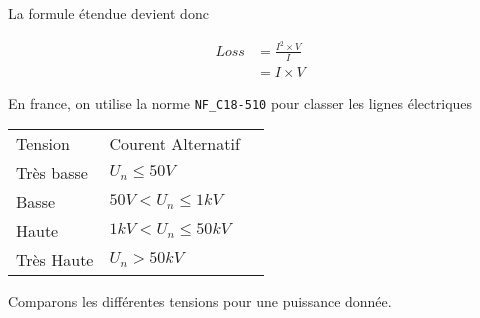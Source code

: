 La formule étendue devient donc

\begin{equation} \label{loss}
  \begin{aligned}
    Loss & = \frac{I^2\times V}{I} \\
         & = I \times V
  \end{aligned}
\end{equation}

En france, on utilise la norme \texttt{NF\_C18-510} pour classer les lignes électriques

\begin{table}[]
  \begin{tabular}{lll}
  Tension    & Courent Alternatif     \\
  Très basse & $U_n \leq 50V$         \\
  Basse      & $50V < U_n \leq 1kV$   \\
  Haute      & $1kV < U_n \leq 50kV$  \\
  Très Haute & $U_n > 50kV$
\end{tabular}
\end{table}


Comparons les différentes tensions pour une puissance donnée.

\lipsum
